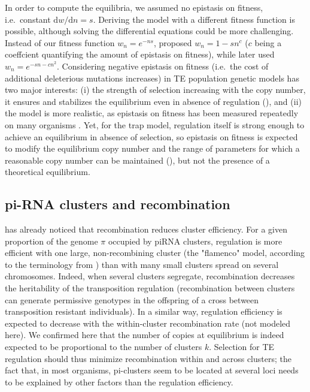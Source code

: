\documentclass[10pt,a4paper]{article}
\begin{document}
In order to compute the equilibria, we assumed no epistasis on fitness, i.e.\ constant $\mathrm d w / \mathrm d n = s$. Deriving the model with a different fitness function is possible, although solving the differential equations could be more challenging. Instead of our fitness function $w_n = e^{-ns}$, \cite{CC83} proposed $w_n = 1 - sn^c$ ($c$ being a coeffcient quantifying the amount of epistasis on fitness), while \cite{DC06} later used $w_n = e^{-sn - cn^2}$. Considering negative epistasis on fitness (i.e.\ the cost of additional deleterious mutations increases) in TE population genetic models has two major interests: (i) the strength of selection increasing with the copy number, it ensures and stabilizes the equilibrium even in absence of regulation (\cite{CC83}), and (ii) the model is more realistic, as epistasis on fitness has been measured repeatedly on many organisms \cite{MRF+05,KSB07,KDS+11}. Yet, for the trap model, regulation itself is strong enough to achieve an equilibrium in absence of selection, so epistasis on fitness is expected to modify the equilibrium copy number and the range of parameters for which a reasonable copy number can be maintained (\cite{Kof19}), but not the presence of a theoretical equilibrium. 

\subsection{pi-RNA clusters and recombination}

\cite{Kof19} has already noticed that recombination reduces cluster efficiency. For a given proportion of the genome $\pi$ occupied by piRNA clusters, regulation is more efficient with one large, non-recombining cluster (the "flamenco" model, according to the terminology from \cite{Kof19}) than with many small clusters spread on several chromosomes. Indeed, when several clusters segregate, recombination decreases the heritability of the transposition regulation (recombination between clusters can generate permissive genotypes in the offspring of a cross between transposition resistant individuals). In a similar way, regulation efficiency is expected to decrease with the within-cluster recombination rate (not modeled here). We confirmed here that the number of copies at equilibrium is indeed expected to be proportional to the number of clusters $k$. Selection for TE regulation should thus minimize recombination within and across clusters; the fact that, in most organisms, pi-clusters seem to be located at several loci needs to be explained by other factors than the regulation efficiency. 
\end{document}
